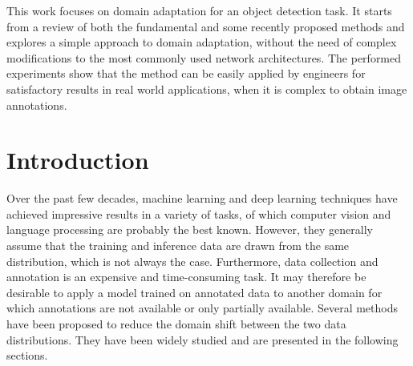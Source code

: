 \documentclass[%
    corpo=12pt,
    twoside,
    stile=classica,   
    tipotesi=magistrale,
    evenboxes,
    english,
	numerazioneromana,
]{toptesi}
\newcommand{\quotes}[1]{``#1''}
\begin{document}
This work focuses on domain adaptation for an object detection task. It starts from a review of both the fundamental and some recently proposed methods and explores a simple approach to domain adaptation, without the need of complex modifications to the most commonly used network architectures. The performed experiments show that the method can be easily applied by engineers for satisfactory results in real world applications, when it is complex to obtain image annotations.

\paginavuota %

\indici

\mainmatter
\english

\chapter*{Introduction}
Over the past few decades, machine learning and deep learning techniques have achieved impressive results in a variety of tasks, of which computer vision and language processing are probably the best known. However, they generally assume that the training and inference data are drawn from the same distribution, which is not always the case. Furthermore, data collection and annotation is an expensive and time-consuming task. It may therefore be desirable to apply a model trained on annotated data to another domain for which annotations are not available or only partially available. Several methods have been proposed to reduce the domain shift between the two data distributions. They have been widely studied and are presented in the following sections.
\end{document}

